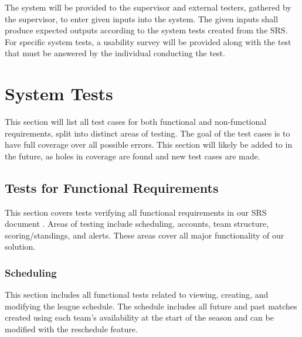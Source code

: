 \documentclass[12pt, titlepage]{article}
\begin{document}
The system will be provided to the supervisor and external testers, gathered by the supervisor,
to enter given inputs into the system. The given inputs shall produce expected outputs according to
the system tests created from the SRS. For specific system tests, a usability survey will be
provided along with the test that must be answered by the individual conducting the test.

\section{System Tests}

This section will list all test cases for both functional and non-functional
requirements, split into distinct areas of testing. The goal of the test cases
is to have full coverage over all possible errors. This section will likely be
added to in the future, as holes in coverage are found and new test cases are
made.

\subsection{Tests for Functional Requirements}

This section covers tests verifying all functional requirements in our SRS
document \cite{SRS}. Areas of testing include scheduling, accounts, team
structure, scoring/standings, and alerts. These areas cover all major
functionality of our solution.

\subsubsection{Scheduling}

This section includes all functional tests related to viewing, creating, and
modifying the league schedule. The schedule includes all future and past
matches created using each team's availability at the start of the season and
can be modified with the reschedule feature.
\end{document}
